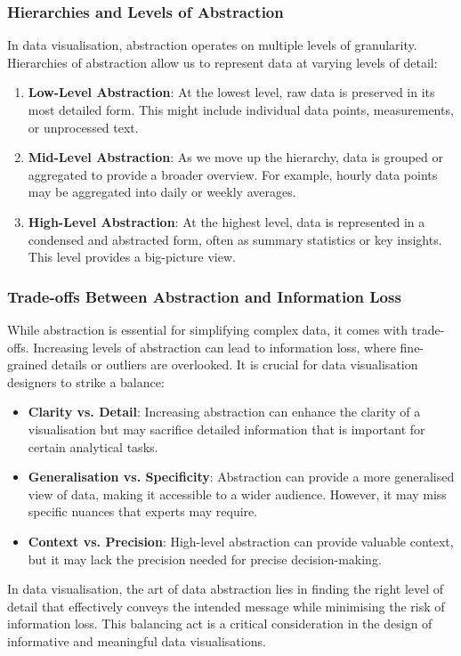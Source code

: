 \documentclass{article}\usepackage[]{graphicx}\usepackage[]{xcolor}
\begin{document}
\subsubsection{Hierarchies and Levels of Abstraction}
In data visualisation, abstraction operates on multiple levels of granularity. Hierarchies of abstraction allow us to represent data at varying levels of detail: 
\begin{enumerate}
    \item \textbf{Low-Level Abstraction}: At the lowest level, raw data is preserved in its most detailed form. This might include individual data points, measurements, or unprocessed text.
    \item \textbf{Mid-Level Abstraction}: As we move up the hierarchy, data is grouped or aggregated to provide a broader overview. For example, hourly data points may be aggregated into daily or weekly averages.
    \item \textbf{High-Level Abstraction}: At the highest level, data is represented in a condensed and abstracted form, often as summary statistics or key insights. This level provides a big-picture view.
\end{enumerate}

\subsubsection{Trade-offs Between Abstraction and Information Loss}
While abstraction is essential for simplifying complex data, it comes with trade-offs. Increasing levels of abstraction can lead to information loss, where fine-grained details or outliers are overlooked. It is crucial for data visualisation designers to strike a balance:
\begin{itemize}
    \item \textbf{Clarity vs. Detail}: Increasing abstraction can enhance the clarity of a visualisation but may sacrifice detailed information that is important for certain analytical tasks.
    \item \textbf{Generalisation vs. Specificity}: Abstraction can provide a more generalised view of data, making it accessible to a wider audience. However, it may miss specific nuances that experts may require.
    \item \textbf{Context vs. Precision}: High-level abstraction can provide valuable context, but it may lack the precision needed for precise decision-making.
\end{itemize}
In data visualisation, the art of data abstraction lies in finding the right level of detail that effectively conveys the intended message while minimising the risk of information loss. This balancing act is a critical consideration in the design of informative and meaningful data visualisations.
\end{document}

